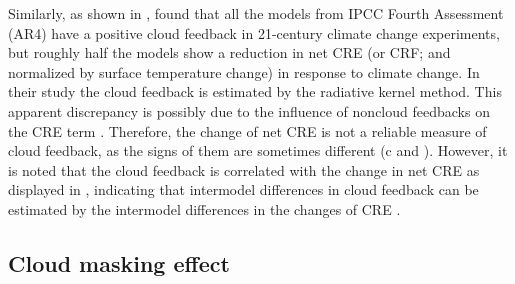 
Similarly, as shown in , \cite{Soden2006} found that all the models from IPCC Fourth Assessment (AR4) have a positive cloud feedback in 21-century climate change experiments, but roughly half the models show a reduction in net CRE (or CRF; and normalized by surface temperature change) in response to climate change. In their study the cloud feedback is estimated by the radiative kernel method. This apparent discrepancy is possibly due to the influence of noncloud feedbacks on the CRE term \citep{Zhang1994,Soden2004}. Therefore, the change of net CRE is not a reliable measure of cloud feedback, as the signs of them are sometimes different (c and ). However, it is noted that the cloud feedback is correlated with the change in net CRE as displayed in , indicating that intermodel differences in cloud feedback can be estimated by the intermodel differences in the changes of CRE \citep{Soden2006,Bony2006}. %

\subsection{Cloud masking effect}
\label{sec:cld_masking_effect}

